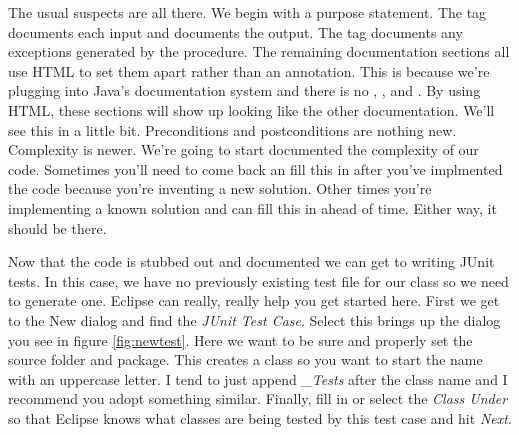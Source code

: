 \documentclass[]{tufte-handout}
\begin{document}
The usual suspects are all there. We begin with a purpose statement. The \@param tag documents each input and \@return documents the output.  The \@throws tag documents any exceptions generated by the procedure. The remaining documentation sections all use HTML to set them apart rather than an \@ annotation. This is because we're plugging into Java's documentation system and there is no \@pre, \@post, and \@complexity.  By using HTML, these sections will show up looking like the other documentation. We'll see this in a little bit. Preconditions and postconditions are nothing new. Complexity is newer. We're going to start documented the complexity of our code. Sometimes you'll need to come back an fill this in after you've implmented the code because you're inventing a new solution. Other times you're implementing a known solution and can fill this in ahead of time. Either way, it should be there. 

Now that the code is stubbed out and documented we can get to writing JUnit tests. In this case, we have no previously existing test file for our class so we need to generate one. Eclipse can really, really help you get started here. First we get to the New dialog and find the \textit{JUnit Test Case}. Select this brings up the dialog you see in figure \ref{fig:newtest}.  Here we want to be sure and 	properly set the source folder and package. This creates a class so you want to start the name with an uppercase letter. I tend to just append \textit{\_Tests} after the class name and I recommend you adopt something similar. Finally, fill in or select the \textit{Class Under} so that Eclipse knows what classes are being tested by this test case and hit \textit{Next}.
\end{document}
